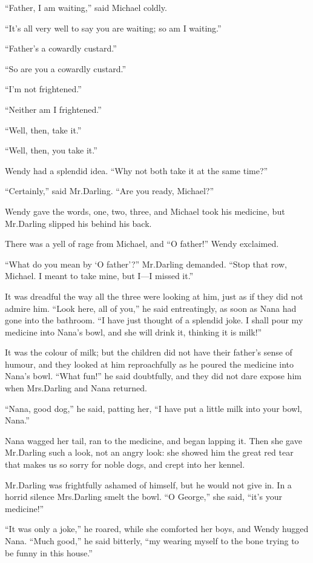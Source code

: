 “Father, I am waiting,” said Michael coldly.

“It’s all very well to say you are waiting;
so am I waiting.”

“Father’s a cowardly custard.”

“So are you a cowardly custard.”

“I’m not frightened.”

“Neither am I frightened.”

“Well, then, take it.”

“Well, then, you take it.”

Wendy had a splendid idea.
“Why not both take it at the same time?”

“Certainly,” said Mr.\@ Darling.
“Are you ready, Michael?”

Wendy gave the words, one, two, three, and Michael took his medicine,
but Mr.\@ Darling slipped his behind his back.

There was a yell of rage from Michael,
and “O father!\@” Wendy exclaimed.

“What do you mean by ‘O father’?\@” Mr.\@ Darling demanded.
“Stop that row, Michael.
I meant to take mine, but I—I missed it.”

It was dreadful the way all the three were looking at him,
just as if they did not admire him.
“Look here, all of you,” he said entreatingly,
as soon as Nana had gone into the bathroom.
“I have just thought of a splendid joke.
I shall pour my medicine into Nana’s bowl, and she will drink it, thinking it is milk!”

It was the colour of milk;
but the children did not have their father’s sense of humour,
and they looked at him reproachfully as he poured the medicine into Nana’s bowl.
“What fun!\@” he said doubtfully, and they did not dare expose him when Mrs.\@ Darling and Nana returned.

“Nana, good dog,” he said, patting her, “I have put a little milk into your bowl, Nana.”

Nana wagged her tail, ran to the medicine, and began lapping it.
Then she gave Mr.\@ Darling such a look, not an angry look:
she showed him the great red tear that makes us so sorry for noble dogs,
and crept into her kennel.

Mr.\@ Darling was frightfully ashamed of himself, but he would not give in.
In a horrid silence Mrs.\@ Darling smelt the bowl.
“O George,” she said, “it’s your medicine!”

“It was only a joke,” he roared,
while she comforted her boys, and Wendy hugged Nana.
“Much good,” he said bitterly, “my wearing myself to the bone trying to be funny in this house.”

